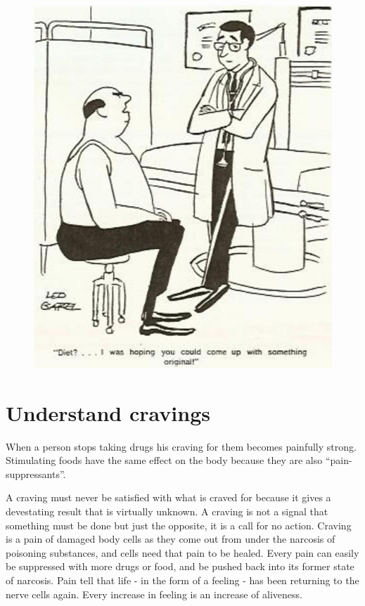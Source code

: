\documentclass[12pt,letterpaper]{article}
\begin{document}
\begin{figure} \centering
  \includegraphics[width=\textwidth]{p15.jpg}
\end{figure}

\section{Understand cravings}

When a person stops taking drugs his craving for them becomes
painfully strong. Stimulating foods have the same effect on the body
because they are also ``pain-suppressants''.

A craving must never be satisfied with what is craved for because it
gives a devestating result that is virtually unknown. A craving is not
a signal that something must be done but just the opposite, it is a
call for no action. Craving is a pain of damaged body cells as they
come out from under the narcosis of poisoning substances, and cells
need that pain to be healed. Every pain can easily be suppressed with
more drugs or food, and be pushed back into its former state of
narcosis. Pain tell that life - in the form of a feeling - has been
returning to the nerve cells again. Every increase in feeling is an
increase of aliveness.
\end{document}
